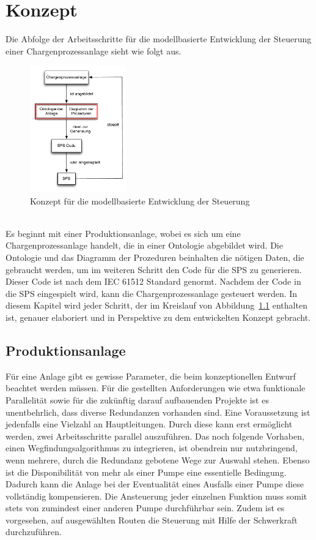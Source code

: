 
\chapter{Konzept} \label{chapter:architecture}
Die Abfolge der Arbeitsschritte für die modellbasierte Entwicklung der Steuerung einer Chargenprozessanlage sieht wie folgt aus.
\begin{figure}[h!]
		\centering
		\includegraphics[width=0.37\textwidth]{graphics/konzept/konzept_new.pdf}
		\caption{Konzept für die modellbasierte Entwicklung der Steuerung}
		\label{fig:konz_konzept_new}
\end{figure} \\
Es beginnt mit einer Produktionsanlage, wobei es sich um eine Chargenprozessanlage handelt, die in einer Ontologie abgebildet wird. Die Ontologie und das Diagramm der Prozeduren beinhalten die nötigen Daten, die gebraucht werden, um im weiteren Schritt den Code für die \ac{SPS} zu generieren. Dieser Code ist nach dem IEC 61512 Standard genormt. Nachdem der Code in die \ac{SPS} eingespielt wird, kann die Chargenprozessanlage gesteuert werden. 
In diesem Kapitel wird jeder Schritt, der im Kreislauf von Abbildung~\ref{fig:konz_konzept_new} enthalten ist, genauer elaboriert und in Perspektive zu dem entwickelten Konzept gebracht.
\section{Produktionsanlage}
Für eine Anlage gibt es gewisse Parameter, die beim konzeptionellen Entwurf beachtet werden müssen. Für die gestellten Anforderungen wie etwa funktionale Parallelität sowie für die zukünftig darauf aufbauenden Projekte ist es unentbehrlich, dass diverse Redundanzen vorhanden sind. Eine Voraussetzung ist jedenfalls eine Vielzahl an Hauptleitungen. Durch diese kann erst ermöglicht werden, zwei Arbeitsschritte parallel auszuführen. Das noch folgende Vorhaben, einen Wegfindungsalgorithmus zu integrieren, ist obendrein nur nutzbringend, wenn mehrere, durch die Redundanz gebotene Wege zur Auswahl stehen. Ebenso ist die Disponibilität von mehr als einer Pumpe eine essentielle Bedingung. Dadurch kann die Anlage bei der Eventualität eines Ausfalls einer Pumpe diese vollständig kompensieren. Die Ansteuerung jeder einzelnen Funktion muss somit stets von zumindest einer anderen Pumpe durchführbar sein. Zudem ist es vorgesehen, auf ausgewählten Routen die Steuerung mit Hilfe der Schwerkraft durchzuführen.\\

